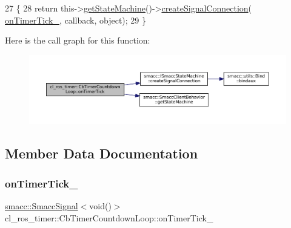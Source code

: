 \begin{DoxyCode}
27     \{
28         \textcolor{keywordflow}{return} this->\hyperlink{classsmacc_1_1SmaccClientBehavior_aa817da149f366f6a28794c04eb0744b0}{getStateMachine}()->\hyperlink{classsmacc_1_1ISmaccStateMachine_adf0f42ade0c65cc471960fe2a7c42da2}{createSignalConnection}(
      \hyperlink{classcl__ros__timer_1_1CbTimerCountdownLoop_a9df6547f8ddf45107d8850d8a1a92cf4}{onTimerTick\_}, callback, \textcolor{keywordtype}{object});
29     \}
\end{DoxyCode}
Here is the call graph for this function\+:
\nopagebreak
\begin{figure}[H]
\begin{center}
\leavevmode
\includegraphics[width=350pt]{classcl__ros__timer_1_1CbTimerCountdownLoop_ad251cc8444ca7070f64658bbb77e1275_cgraph}
\end{center}
\end{figure}


\subsection{Member Data Documentation}
\mbox{\label{classcl__ros__timer_1_1CbTimerCountdownLoop_a9df6547f8ddf45107d8850d8a1a92cf4}} 
\subsubsection{\texorpdfstring{on\+Timer\+Tick\+\_\+}{onTimerTick\_}}
{\footnotesize\ttfamily \hyperlink{classsmacc_1_1SmaccSignal}{smacc\+::\+Smacc\+Signal}$<$void()$>$ cl\+\_\+ros\+\_\+timer\+::\+Cb\+Timer\+Countdown\+Loop\+::on\+Timer\+Tick\+\_\+\hspace{0.3cm}{\ttfamily [private]}}



